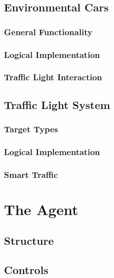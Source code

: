 \documentclass{article}
\begin{document}
\subsection{Environmental Cars}
\lipsum[2][1]

\subsubsection{General Functionality}
\lipsum[2][1]

\subsubsection{Logical Implementation}
\lipsum[2][1]

\subsubsection{Traffic Light Interaction}
\lipsum[2][1]

\subsection{Traffic Light System}
\lipsum[2][1]

\subsubsection{Target Types}
\lipsum[2][1]

\subsubsection{Logical Implementation}
\lipsum[2][1]

\subsubsection{Smart Traffic}
\lipsum[2][1]

\section{The Agent}
\lipsum[2][1]

\subsection{Structure}
\lipsum[2][1]

\subsection{Controls}
\lipsum[2][1]
\end{document}
